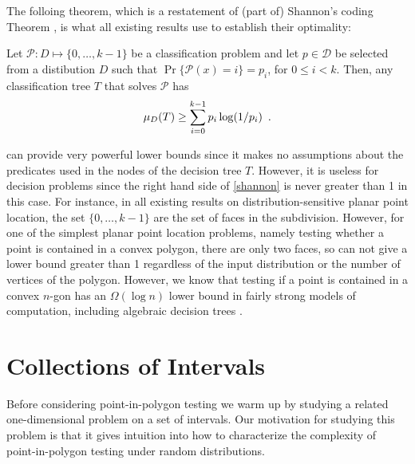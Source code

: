 \documentclass[charterfonts,lotsofwhite]{patmorin}
\begin{document}
The folloing theorem, which is a restatement of (part of) Shannon's
coding Theorem \cite{sXX}, is what all existing results use to
establish their optimality:

\begin{thm}
Let $\mathcal{P}:D\mapsto \{0,\ldots,k-1\}$ be a classification
problem and let $p\in \mathcal{D}$ be selected from a distibution $D$ such
that $\Pr\{\mathcal{P}(x)= i\}=p_i$, for $0\le i< k$.  Then, any
classification tree $T$ that solves $\mathcal{P}$ has
\begin{equation}
     \mu_D(T) \ge \sum_{i=0}^{k-1} p_i\log(1/p_i) \enspace .
	\eqlabel{shannon}
\end{equation}
\end{thm}

 can provide very powerful lower bounds since it makes
no assumptions about the predicates used in the nodes of the decision
tree $T$.  However, it is useless for decision problems since the
right hand side of \eqref{shannon} is never greater than 1 in this
case.  For instance, in all existing results on distribution-sensitive
planar point location, the set $\{0,\ldots,k-1\}$ are the set of faces
in the subdivision.  However, for one of the simplest planar point
location problems, namely testing whether a point is contained in a
convex polygon, there are only two faces, so  can not
give a lower bound greater than 1 regardless of the input distribution
or the number of vertices of the polygon.  However, we know 
that testing if a point is contained in a convex $n$-gon has an
$\Omega(\log n)$ lower bound in fairly strong models of computation,
including algebraic decision trees \cite{bo}.

\section{Collections of Intervals}

Before considering point-in-polygon testing we warm up by studying a
related one-dimensional problem on a set of intervals.  Our motivation
for studying this problem is that it gives intuition into how to
characterize the complexity of point-in-polygon testing under random
distributions.
\end{document}
